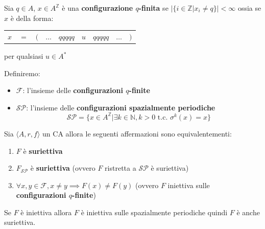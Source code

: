 \begin{definizione}
    Sia $q\in A$, $x\in A^\mathbb{Z}$ è una \textbf{configurazione $q$-finita}
    se $|\{i\in \mathbb{Z}| x_i\ne q\}|< \infty$ ossia se $x$ è della forma:
    \begin{table}[!h]
        \centering
        \begin{tabular}{ccccccccc}
            $x$ & $=$ & $($ & $\dots$ & $qqqqq$ & $u$ & $qqqqq$ & $\dots$ & $)$ \\
        \end{tabular}
    \end{table}
    per qualsiasi $u\in A^\ast$
\end{definizione}

\begin{definizione}
    Definiremo:
    \begin{itemize}
        \item $\mathcal{F}$: l'insieme delle \textbf{configurazioni $q$-finite}
        \item $\mathcal{SP}$: l'insieme delle \textbf{configurazioni spazialmente periodiche}
              \begin{equation*}
                  \mathcal{SP}= \{x\in A^\mathbb{Z} | \exists k \in \mathbb{N}, k>0 \text{ t.c. }\sigma^k(x)=x\}
              \end{equation*}
    \end{itemize}
\end{definizione}

\begin{teorema}
    Sia $\langle A,r,f\rangle$ un CA allora le seguenti affermazioni sono equivalentementi:
    \begin{enumerate}
        \item $F$ è \textbf{suriettiva}
        \item $F_{\mathcal{SP}}$ è \textbf{suriettiva} (ovvero $F$ ristretta a $\mathcal{SP}$ è suriettiva)
        \item $\forall x,y \in \mathcal{F}, x\ne y \implies F(x)\ne F(y)$ (ovvero $F$ iniettiva sulle \textbf{configurazioni $q$-finite})
    \end{enumerate}
\end{teorema}

\begin{teorema}
    Se $F$ è iniettiva allora $F$ è iniettiva sulle spazialmente periodiche quindi
    $F$ è anche suriettiva.
\end{teorema}

